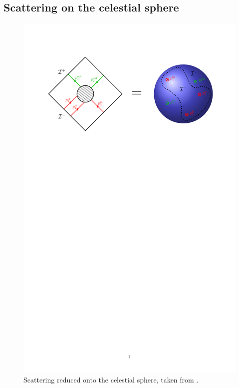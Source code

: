 \documentclass[a4paper
	,10pt
]{article}
\begin{document}
\subsection{Scattering on the celestial sphere}
	
	\begin{figure}[!ht]
	\centering
	\includegraphics[width=.7\linewidth]{img/celestialsphere.pdf}
	\caption[Scattering on the celestial sphere]{
		Scattering reduced onto the celestial sphere, taken from \cite{Strominger:2017zoo}.
	}
	\end{figure}
	
\pagebreak[3]
	
\end{document}
